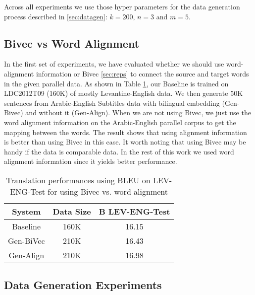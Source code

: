\documentclass[a4paper]{article}
\begin{document}
Across all experiments we use those hyper parameters for the data generation process described in \textsection\ref{sec:datagen}: $k=200$, $n=3$ and $m=5$.


\subsection{Bivec vs Word Alignment}
\label{sec:bivec}

In the first set of experiments, we have  evaluated whether we should use word-alignment information or Bivec \textsection\ref{sec:reps}  to connect the source and target words in the given parallel data. As shown in Table \ref{tab:rep}, our Baseline is trained on LDC2012T09 (160K)  of mostly Levantine-English data. We then generate 50K sentences from Arabic-English Subtitles data  with bilingual embedding (Gen-Bivec) and without it (Gen-Align). When we are not using Bivec, we just use the word alignment information on the Arabic-English parallel corpus to get the mapping between the words. The result shows that using alignment information is better than using Bivec in this case. It worth noting that using  Bivec may be handy if the data is comparable  data. In the rest of this work we  used word alignment information since it yields better performance.


\begin{table}
{\small
\begin{center}
\begin{tabular}{c|c|c}
System & Data Size & B LEV-ENG-Test \\
\hline
Baseline & 160K & 16.15 \\
Gen-BiVec & 210K & 16.43  \\
Gen-Align & 210K & 16.98   \\ 
\end{tabular}
\end{center}
\caption{Translation performances using BLEU on LEV-ENG-Test for using Bivec vs. word alignment 
\label{tab:rep}}
}
\end{table}

\subsection{Data Generation Experiments}
\end{document}

